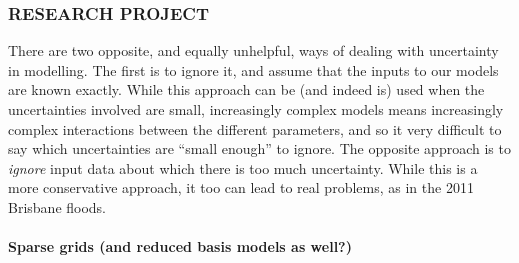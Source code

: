 \documentclass[a4paper,fontsize=12pt]{scrartcl}
\begin{document}

\subsubsection*{RESEARCH PROJECT}

There are two opposite, and equally unhelpful, ways of dealing with
uncertainty in modelling. The first is to ignore it, and assume that
the inputs to our models are known exactly. While this approach can be
(and indeed is) used when the uncertainties involved are small,
increasingly complex models means increasingly complex interactions
between the different parameters, and so it very difficult to say
which uncertainties are ``small enough'' to ignore. The opposite
approach is to \emph{ignore} input data about which there is too much
uncertainty. While this is a more conservative approach, it too can
lead to real problems, as in the 2011 Brisbane floods.

\paragraph{Sparse grids (and reduced basis models as well?)}
\end{document}

